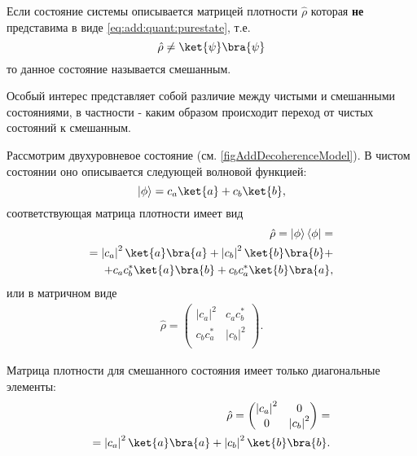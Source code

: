 \begin{definition}
Если состояние системы описывается матрицей плотности $\hat{\rho}$
которая \textbf{не} представима в виде
\eqref{eq:add:quant:purestate}, т.е. 
\[
\hat{\rho} \ne \ket{\psi}\bra{\psi}
\]
то данное состояние называется смешанным.
\end{definition}


Особый интерес представляет собой различие между чистыми и смешанными
состояниями, в частности - каким образом происходит переход от чистых
состояний к смешанным.

Рассмотрим двухуровневое состояние
(см. \autoref{figAddDecoherenceModel}). В чистом состоянии оно
описывается 
следующей волновой функцией:
\begin{equation}
\left|\phi\right> = c_a \ket{a } + c_b \ket{b},
\nonumber
\end{equation}
соответствующая матрица плотности имеет вид
\begin{eqnarray}
\hat{\rho} = \left|\phi\right>\left<\phi\right| =
\nonumber \\
= 
\left|c_a\right|^2 \ket{a}\bra{a} + 
\left|c_b\right|^2 \ket{b}\bra{b} +
\nonumber \\
+
c_a c_b^{\ast}\ket{a}\bra{b} +
c_b c_a^{\ast}\ket{b}\bra{a},
\label{eqAddDecoherencePure}
\end{eqnarray}
или в матричном виде
\begin{eqnarray}
\hat{\rho} = 
\begin{pmatrix}
\left|c_a\right|^2 & c_a c_b^{\ast} \\
c_b c_a^{\ast} & \left|c_b\right|^2 \\
\end{pmatrix}.
\nonumber
\end{eqnarray}

Матрица плотности 
для смешанного состояния имеет только диагональные
элементы:
\begin{eqnarray}
\hat{\rho} = 
\begin{pmatrix}
\left|c_a\right|^2 & 0 \\
0 & \left|c_b\right|^2 \\
\end{pmatrix} = 
\nonumber \\
=
\left|c_a\right|^2 \ket{a}\bra{a} + 
\left|c_b\right|^2 \ket{b}\bra{b}.
\label{eqAddDecoherenceMix}
\end{eqnarray}



